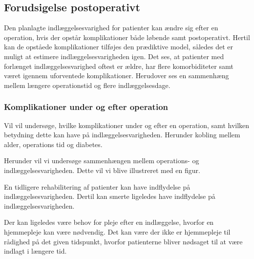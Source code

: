 \subsection{Forudsigelse postoperativt}
Den planlagte indlæggelsesvarighed for patienter kan ændre sig efter en operation, hvis der opstår komplikationer både løbende samt postoperativt. Hertil kan de opståede komplikationer tilføjes den prædiktive model, således det er muligt at estimere indlæggelsesvarigheden igen. Det ses, at patienter med forlænget indlæggelsesvarighed oftest er ældre, har flere komorbiditeter samt været igennem uforventede komplikationer. \cite{Krell2014} Herudover ses en sammenhæng mellem længere operationstid og flere indlæggelsesdage.\cite{Kjeldsen2015b}


\subsubsection{Komplikationer under og efter operation}
Vil vil undersøge, hvilke komplikationer under og efter en operation, samt hvilken betydning dette kan have på indlæggelsesvarigheden. Herunder kobling mellem alder, operations tid og diabetes. 

Herunder vil vi undersøge sammenhængen mellem operations- og indlæggelsesvarigheden. Dette vil vi blive illustreret med en figur.


En tidligere rehabilitering af patienter kan have indflydelse på indlæggelsesvarigheden. Dertil kan smerte ligeledes have indflydelse på indlæggelsesvarigheden.


Der kan ligeledes være behov for pleje efter en indlæggelse, hvorfor en hjemmepleje kan være nødvendig. Det kan være der ikke er hjemmepleje til rådighed på det given tidspunkt, hvorfor patienterne bliver nødsaget til at være indlagt i længere tid. 